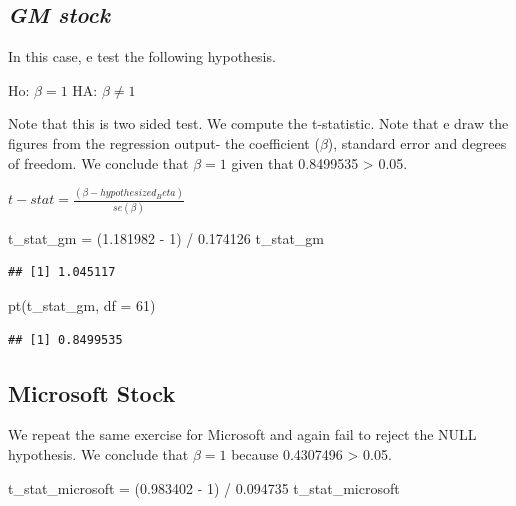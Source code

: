 \documentclass[
]{article}
\newenvironment{Shaded}{\begin{snugshade}}{\end{snugshade}}
\newcommand{\AttributeTok}[1]{\textcolor[rgb]{0.77,0.63,0.00}{#1}}
\newcommand{\DecValTok}[1]{\textcolor[rgb]{0.00,0.00,0.81}{#1}}
\newcommand{\FloatTok}[1]{\textcolor[rgb]{0.00,0.00,0.81}{#1}}
\newcommand{\FunctionTok}[1]{\textcolor[rgb]{0.00,0.00,0.00}{#1}}
\newcommand{\NormalTok}[1]{#1}
\newcommand{\OtherTok}[1]{\textcolor[rgb]{0.56,0.35,0.01}{#1}}
\newcommand{\SpecialCharTok}[1]{\textcolor[rgb]{0.00,0.00,0.00}{#1}}
\begin{document}
\hypertarget{gm-stock-1}{%
\subsection{\texorpdfstring{\textbf{\emph{GM
stock}}}{GM stock}}\label{gm-stock-1}}

In this case, e test the following hypothesis.

Ho: \(\beta = 1\) HA: \(\beta \neq 1\)

Note that this is two sided test. We compute the t-statistic. Note that
e draw the figures from the regression output- the coefficient
(\(\beta\)), standard error and degrees of freedom. We conclude that
\(\beta = 1\) given that 0.8499535 \textgreater{} 0.05.

\(t-stat = \frac{(\beta - hypothesized_Beta)}{se(\beta)}\)

\begin{Shaded}
\begin{Highlighting}[]
\NormalTok{t\_stat\_gm }\OtherTok{=}\NormalTok{ (}\FloatTok{1.181982} \SpecialCharTok{{-}} \DecValTok{1}\NormalTok{) }\SpecialCharTok{/} \FloatTok{0.174126}
\NormalTok{t\_stat\_gm}
\end{Highlighting}
\end{Shaded}

\begin{verbatim}
## [1] 1.045117
\end{verbatim}

\begin{Shaded}
\begin{Highlighting}[]
\FunctionTok{pt}\NormalTok{(t\_stat\_gm, }\AttributeTok{df =} \DecValTok{61}\NormalTok{)}
\end{Highlighting}
\end{Shaded}

\begin{verbatim}
## [1] 0.8499535
\end{verbatim}

\hypertarget{microsoft-stock-1}{%
\subsection{\texorpdfstring{\textbf{Microsoft
Stock}}{Microsoft Stock}}\label{microsoft-stock-1}}

We repeat the same exercise for Microsoft and again fail to reject the
NULL hypothesis. We conclude that \(\beta = 1\) because 0.4307496
\textgreater{} 0.05.

\begin{Shaded}
\begin{Highlighting}[]
\NormalTok{t\_stat\_microsoft }\OtherTok{=}\NormalTok{ (}\FloatTok{0.983402} \SpecialCharTok{{-}} \DecValTok{1}\NormalTok{) }\SpecialCharTok{/} \FloatTok{0.094735}
\NormalTok{t\_stat\_microsoft}
\end{Highlighting}
\end{Shaded}
\end{document}
